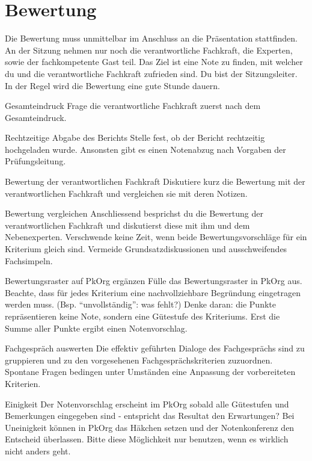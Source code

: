 \section{Bewertung}
Die Bewertung muss unmittelbar im Anschluss an die Präsentation stattfinden. An der Sitzung
nehmen nur noch die verantwortliche Fachkraft, die Experten, sowie der fachkompetente Gast teil. Das Ziel ist eine Note zu finden, mit welcher du und die verantwortliche Fachkraft zufrieden sind. Du bist der Sitzungsleiter. In der Regel wird die Bewertung eine gute Stunde dauern.

\begin{taskitem}{Gesamteindruck}
  Frage die verantwortliche Fachkraft zuerst nach dem Gesamteindruck.
\end{taskitem}
\begin{taskitem}{Rechtzeitige Abgabe des Berichts}
  Stelle fest, ob der Bericht rechtzeitig hochgeladen wurde. Ansonsten gibt es einen Notenabzug nach Vorgaben der Prüfungsleitung.
\end{taskitem}
\begin{taskitem}{Bewertung der verantwortlichen Fachkraft}
  Diskutiere kurz die Bewertung mit der verantwortlichen Fachkraft und vergleichen sie mit deren Notizen.
\end{taskitem}
\begin{taskitem}{Bewertung vergleichen}
  Anschliessend besprichst du die Bewertung der verantwortlichen Fachkraft und diskutierst diese mit ihm und dem Nebenexperten. Verschwende keine Zeit, wenn beide Bewertungsvorschläge für ein Kriterium gleich sind. Vermeide Grundsatzdiskussionen und ausschweifendes Fachsimpeln.
\end{taskitem}
\begin{taskitem}{Bewertungsraster auf PkOrg ergänzen}
  Fülle das Bewertungsraster in PkOrg aus. Beachte, dass für jedes Kriterium eine nachvollziehbare Begründung eingetragen werden muss. (Bsp. \enquote{unvollständig}: was fehlt?) Denke daran: die Punkte repräsentieren keine Note, sondern eine Gütestufe des Kriteriums. Erst die Summe aller Punkte ergibt einen Notenvorschlag.
\end{taskitem}
\begin{taskitem}{Fachgespräch auswerten}
  Die effektiv geführten Dialoge des Fachgesprächs sind zu gruppieren und zu den vorgesehenen Fachgesprächskriterien zuzuordnen. Spontane Fragen bedingen unter Umständen eine Anpassung der vorbereiteten Kriterien.
\end{taskitem}
\begin{taskitem}{Einigkeit}
  Der Notenvorschlag erscheint im PkOrg sobald alle Gütestufen und Bemerkungen eingegeben sind - entspricht das Resultat den Erwartungen? Bei Uneinigkeit können in PkOrg das Häkchen setzen und der Notenkonferenz den Entscheid überlassen. Bitte diese Möglichkeit nur benutzen, wenn es wirklich nicht anders geht.
\end{taskitem}

